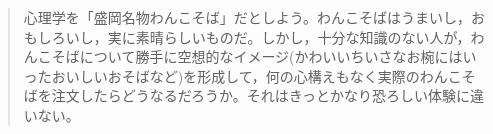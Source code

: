 \begin{quote}
	心理学を「盛岡名物わんこそば」だとしよう。わんこそばはうまいし，おもしろいし，実に素晴らしいものだ。しかし，十分な知識のない人が，わんこそばについて勝手に空想的なイメージ(かわいいちいさなお椀にはいったおいしいおそばなど)を形成して，何の心構えもなく実際のわんこそばを注文したらどうなるだろうか。それはきっとかなり恐ろしい体験に違いない。
\end{quote}
